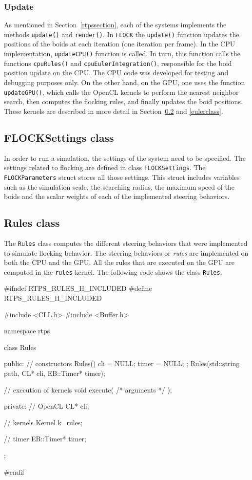 \subsubsection{Update}
As mentioned in Section~\ref{rtpssection}, each of the systems implements the methods \texttt{update()} and \texttt{render()}. In \texttt{FLOCK} the \texttt{update()} function updates the positions of the boids at each iteration (one iteration per frame). In the CPU implementation, \texttt{updateCPU()} function is called. In turn, this function calls the functions \texttt{cpuRules()} and \texttt{cpuEulerIntegration()}, responsible for the boid position update on the CPU. The CPU code was developed for testing and debugging purposes only. On the other hand, on the GPU, one uses the function \texttt{updateGPU()}, which calls the OpenCL kernels to perform the nearest neighbor search, then computes the flocking rules, and finally updates the boid positions. These kernels are described in more detail in Section~\ref{rulesclass} and \ref{eulerclass}.

\subsection{FLOCKSettings class}
In order to run a simulation, the settings of the system need to be specified. The settings related to flocking are defined in class \texttt{FLOCKSettings}. The \texttt{FLOCKParameters} struct stores all those settings. This struct includes variables such as the simulation scale, the searching radius, the maximum speed of the boids and the scalar weights of each of the implemented steering behaviors. 

\subsection{Rules class}\label{rulesclass}
The \texttt{Rules} class computes the different steering behaviors that were implemented to simulate flocking behavior. The steering behaviors or \textit{rules} are implemented on both the CPU and the GPU. All the rules that are executed on the GPU are computed in the \texttt{rules} kernel. The following code shows the class \texttt{Rules}.

\begin{cppcode}{0}
#ifndef RTPS_RULES_H_INCLUDED
#define RTPS_RULES_H_INCLUDED

#include <CLL.h>
 #include <Buffer.h>

namespace rtps
 {
	class Rules
	{
		public:
			// constructors
			Rules() { cli = NULL; timer = NULL; };
			Rules(std::string path, CL* cli, EB::Timer* timer);
			
			// execution of kernels
			void execute( /* arguments */ );
			
		private:
			// OpenCL
			CL* cli;
			
			// kernels
			Kernel k_rules;
			
			// timer
			EB::Timer* timer;
	};
}
#endif
\end{cppcode}

